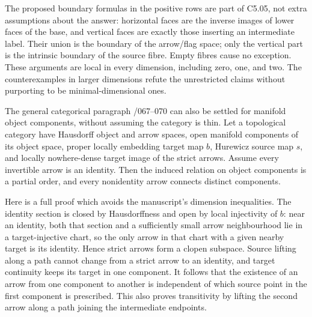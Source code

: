 The proposed boundary formulas in the positive rows are part of C5.05, not extra assumptions about the answer: horizontal faces are the inverse images of lower faces of the base, and vertical faces are exactly those inserting an intermediate label. Their union is the boundary of the arrow/flag space; only the vertical part is the intrinsic boundary of the source fibre. Empty fibres cause no exception. These arguments are local in every dimension, including zero, one, and two. The counterexamples in larger dimensions refute the unrestricted claims without purporting to be minimal-dimensional ones.

The general categorical paragraph /067--070 can also be settled for manifold object components, without assuming the category is thin. Let a topological category have Hausdorff object and arrow spaces, open manifold components of its object space, proper locally embedding target map \(b\), Hurewicz source map \(s\), and locally nowhere-dense target image of the strict arrows. Assume every invertible arrow is an identity. Then the induced relation on object components is a partial order, and every nonidentity arrow connects distinct components.

Here is a full proof which avoids the manuscript's dimension inequalities. The identity section is closed by Hausdorffness and open by local injectivity of \(b\): near an identity, both that section and a sufficiently small arrow neighbourhood lie in a target-injective chart, so the only arrow in that chart with a given nearby target is its identity. Hence strict arrows form a clopen subspace. Source lifting along a path cannot change from a strict arrow to an identity, and target continuity keeps its target in one component. It follows that the existence of an arrow from one component to another is independent of which source point in the first component is prescribed. This also proves transitivity by lifting the second arrow along a path joining the intermediate endpoints.

